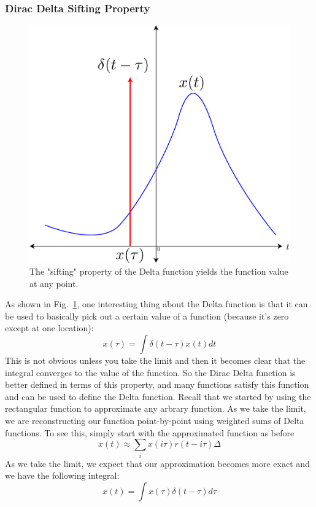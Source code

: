 \subsubsection{Dirac Delta Sifting Property}
\begin{figure}[tb]
\centering
\includegraphics[width=.5\columnwidth]{delta_sift}
\caption{The "sifting" property of the Delta function yields the function value at any point. }
\label{fig:delta_sift}
\end{figure}
As shown in Fig.~\ref{fig:delta_sift}, one interesting thing about the Delta function is that it can be used to basically pick out a certain value of a function (because it's zero except at one location):
    \begin{equation}
        x\left(\tau\right)=\int\delta\left(t-\tau\right)x\left(t\right)dt
    \end{equation}
This is not obvious unless you take the limit and then it becomes clear that the integral converges to the value of the function.  So the Dirac Delta function is better defined in terms of this property, and many functions satisfy this function and can be used to define the Delta function.
Recall that we started by using the rectangular function to approximate any arbrary function.  As we take the limit, we are reconstructing our function point-by-point using weighted sums of Delta functions.  To see this, simply start with the approximated  function as before
    \begin{equation}
        x(t) \approx \sum_i x(i\tau) r(t - i\tau) \Delta
    \end{equation}
As we take the limit, we expect that our approximation becomes more exact and we have the following integral:
    \begin{equation}
        x\left(t\right)=\int x\left(\tau\right)\delta\left(t-\tau\right)d\tau
    \end{equation}
